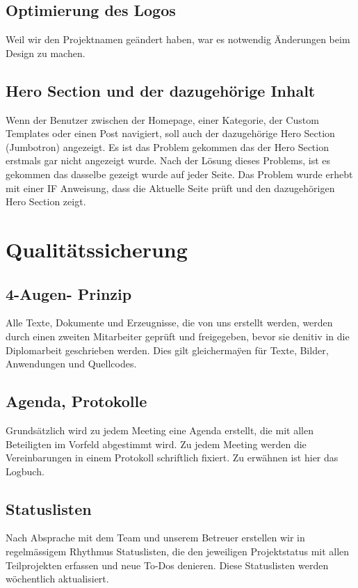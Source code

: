 \subsection{Optimierung des Logos}
Weil wir den Projektnamen ge\"andert haben, war es notwendig \"Anderungen beim Design zu machen.

\subsection{Hero Section und der dazugeh\"orige Inhalt}
Wenn der Benutzer zwischen der Homepage, einer Kategorie, der Custom Templates oder einen Post navigiert, soll auch der dazugeh\"orige Hero Section (Jumbotron) angezeigt. Es ist das Problem gekommen das der Hero Section erstmals gar nicht angezeigt wurde. Nach der L\"osung dieses Problems, ist es gekommen das dasselbe gezeigt wurde auf jeder Seite. Das Problem wurde erhebt mit einer IF Anweisung, dass die Aktuelle Seite pr\"uft und den dazugeh\"origen Hero Section zeigt. 

\section{Qualitätssicherung}

\subsection{4-Augen- Prinzip}
Alle Texte, Dokumente und Erzeugnisse, die von uns erstellt werden,
werden durch einen zweiten Mitarbeiter geprüft und freigegeben, bevor
sie denitiv in die Diplomarbeit geschrieben werden. Dies gilt
gleichermaÿen für Texte, Bilder, Anwendungen und Quellcodes.

\subsection{Agenda, Protokolle}
Grundsätzlich wird zu jedem Meeting eine Agenda erstellt, die mit allen
Beteiligten im Vorfeld abgestimmt wird. Zu jedem Meeting werden die
Vereinbarungen in einem Protokoll schriftlich fixiert. Zu erwähnen ist
hier das Logbuch.

\subsection{Statuslisten}
Nach Absprache mit dem Team und unserem Betreuer erstellen wir in regelmässigem Rhythmus Statuslisten, die den jeweiligen Projektstatus mit allen Teilprojekten erfassen und neue To-Dos denieren. Diese Statuslisten werden wöchentlich aktualisiert.


